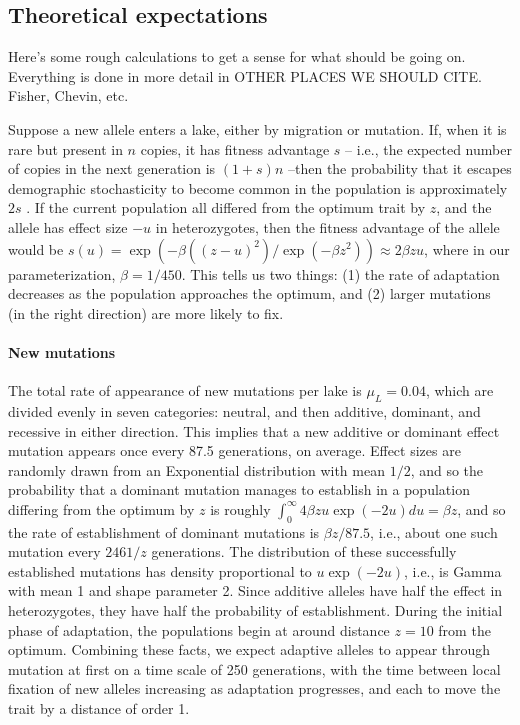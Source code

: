 \documentclass{article}
\newcommand{\plr}[1]{\todo[linecolor=blue,backgroundcolor=blue!25,bordercolor=blue]{#1}}
\begin{document}
\subsection*{Theoretical expectations}
\plr{does this go first or second?}

Here's some rough calculations to get a sense for what should be going on. Everything is done in more detail in OTHER PLACES WE SHOULD CITE.
Fisher, Chevin, etc.

Suppose a new allele enters a lake, either by migration or mutation. If, when it is rare but present in $n$ copies, it has fitness advantage $s$ -- i.e., the expected number of copies in the next generation is $(1+s)n$ --then the probability that it escapes demographic stochasticity to become common in the population is approximately $2s$ \citep{fisher,prob_fixation}. If the current population all differed from the optimum trait by $z$, and the allele has effect size $-u$ in heterozygotes, then the fitness advantage of the allele would be $s(u) = \exp(-\beta((z - u)^2) / \exp( - \beta z^2)) \approx 2 \beta z u$, where in our parameterization, $\beta = 1 / 450$. This tells us two things: (1) the rate of adaptation decreases as the population approaches the optimum, and (2) larger mutations (in the right direction) are more likely to fix.

\paragraph{New mutations}
The total rate of appearance of new mutations per lake is $\mu_L = 0.04$, which are divided evenly in seven categories: neutral, and then additive, dominant, and recessive in either direction. This implies that a new additive or dominant effect mutation appears once every 87.5 generations, on average. Effect sizes are randomly drawn from an Exponential distribution with mean $1/2$, and so the probability that a dominant mutation manages to establish in a population differing from the optimum by $z$ is roughly $\int_0^\infty 4 \beta z u \exp(-2u) du = \beta z$, and so the rate of establishment of dominant mutations is $\beta z / 87.5$, i.e., about one such mutation every $2461/z$ generations. The distribution of these successfully established mutations  has density proportional to $u \exp(-2u)$, i.e., is Gamma with mean 1 and shape parameter 2. Since additive alleles have half the effect in heterozygotes, they have half the probability of establishment. During the initial phase of adaptation, the populations begin at around distance $z=10$ from the optimum. Combining these facts, we expect adaptive alleles to appear through mutation at first on a time scale of 250 generations, with the time between local fixation of new alleles increasing as adaptation progresses, and each to move the trait by a distance of order 1.
\end{document}
